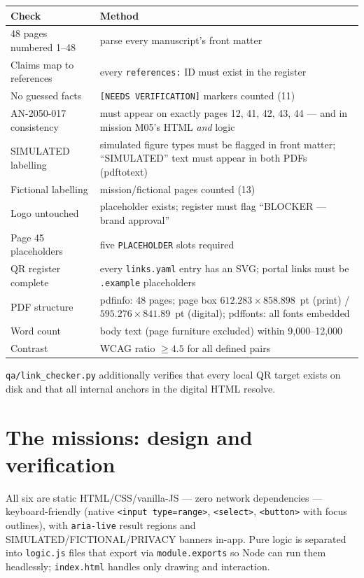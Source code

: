 \documentclass[11pt,a4paper]{article}
\newcommand{\code}[1]{\texttt{#1}}
\begin{document}
\begin{longtable}{p{66mm}p{80mm}}
\textbf{Check} & \textbf{Method}\\
\endhead
48 pages numbered 1--48 & parse every manuscript's front matter\\
Claims map to references & every \code{references:} ID must exist in the
register\\
No guessed facts & \texttt{[NEEDS VERIFICATION]} markers counted (11)\\
AN-2050-017 consistency & must appear on exactly pages 12, 41, 42, 43, 44 ---
and in mission M05's HTML \emph{and} logic\\
SIMULATED labelling & simulated figure types must be flagged in front matter;
``SIMULATED'' text must appear in both PDFs (pdftotext)\\
Fictional labelling & mission/fictional pages counted (13)\\
Logo untouched & placeholder exists; register must flag ``BLOCKER --- brand
approval''\\
Page 45 placeholders & five \texttt{PLACEHOLDER} slots required\\
QR register complete & every \code{links.yaml} entry has an SVG; portal links
must be \code{.example} placeholders\\
PDF structure & pdfinfo: 48 pages; page box $612.283\times858.898$~pt (print)
/ $595.276\times841.89$~pt (digital); pdffonts: all fonts embedded\\
Word count & body text (page furniture excluded) within 9{,}000--12{,}000\\
Contrast & WCAG ratio $\ge 4.5$ for all defined pairs\\
\end{longtable}

\code{qa/link\_checker.py} additionally verifies that every local QR target
exists on disk and that all internal anchors in the digital HTML resolve.

\section{The missions: design and verification}

All six are static HTML/CSS/vanilla-JS --- zero network dependencies ---
keyboard-friendly (native \code{<input type=range>}, \code{<select>},
\code{<button>} with focus outlines), with \code{aria-live} result regions and
SIMULATED/FICTIONAL/PRIVACY banners in-app. Pure logic is separated into
\code{logic.js} files that export via \code{module.exports} so Node can run
them headlessly; \code{index.html} handles only drawing and interaction.
\end{document}
